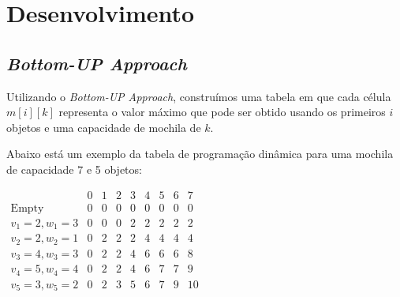 \chapter{Desenvolvimento}
\label{chap:dev}


\section{\textit{Bottom-UP Approach}}

Utilizando o \textit{Bottom-UP Approach}\cite{Bottom-UP}, construímos uma tabela em que cada célula \( m[i][k] \) representa o valor máximo que pode ser obtido usando os primeiros \( i \) objetos e uma capacidade de mochila de \( k \).

Abaixo está um exemplo da tabela de programação dinâmica para uma mochila de capacidade \( 7 \) e 5 objetos:


\begin{center} 
$
\begin{array}{c|cccccccc}
 & 0 & 1 & 2 & 3 & 4 & 5 & 6 & 7 \\
\hline
\text{Empty} & 0 & 0 & 0 & 0 & 0 & 0 & 0 & 0 \\
v_1=2, w_1=3 & 0 & 0 & 0 & 2 & 2 & 2 & 2 & 2 \\
v_2=2, w_2=1 & 0 & 2 & 2 & 2 & 4 & 4 & 4 & 4 \\
v_3=4, w_3=3 & 0 & 2 & 2 & 4 & 6 & 6 & 6 & 8 \\
v_4=5, w_4=4 & 0 & 2 & 2 & 4 & 6 & 7 & 7 & 9 \\
v_5=3, w_5=2 & 0 & 2 & 3 & 5 & 6 & 7 & 9 & 10 \\
\end{array}
$
\end{center}


